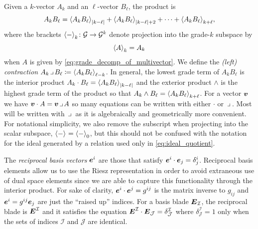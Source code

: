 \documentclass{article}
\begin{document}
Given a $k$-vector $A_k$ and an $\ell$-vector $B_\ell$, the product is
\begin{equation}
\label{eq:general_clifford_multiplication}
A_k B_\ell = \proj{|k-\ell|}{A_k B_\ell} + \proj{|k-\ell|+2}{A_k B_\ell} + \cdots + \proj{k+\ell}{A_k B_\ell},
\end{equation}
where the brackets $\proj{k}{-} \colon \G \to \G^k$ denote projection into the grade-$k$ subspace by
\begin{equation}
\proj{k}{A}=A_k
\end{equation}
when $A$ is given by \cref{eq:grade_decomp_of_multivector}. We define the \emph{(left) contraction} $A_k \contract B_\ell \coloneqq \proj{\ell-k}{A_k B_\ell}$. In general, the lowest grade term of $A_kB_\ell$ is the interior product $A_k \cdot B_\ell = \proj{|k-\ell|}{A_kB_\ell}$ and the exterior product $\wedge$ is the highest grade term of the product so that $A_k \wedge B_\ell = \proj{k+\ell}{A_k B_\ell}$. For a vector $\blade{v}$ we have $\blade{v}\cdot A = \blade{v}\contract A$ so many equations can be written with either $\cdot$ or $\contract$. Most will be written with $\contract$ as it is algebraically and geometrically more convenient. For notational simplicity, we also remove the subscript when projecting into the scalar subspace, $\proj{}{-}=\proj{0}{-}$, but this should not be confused with the notation for the ideal generated by a relation used only in \cref{eq:ideal_quotient}.

The \emph{reciprocal basis vectors $\blade{e}^i$} are those that satisfy $\blade{e}^i \cdot \blade{e}_j = \delta^i_j$. Reciprocal basis elements allow us to use the Riesz representation in order to avoid extraneous use of dual space elements since we are able to capture this functionality through the interior product. For sake of clarity, $\blade{e}^i \cdot \blade{e}^j = g^{ij}$ is the matrix inverse to $g_{ij}$ and $\blade{e}^i = g^{ij} \blade{e}_j$ are just the ``raised up'' indices. For a basis blade $\blade{E}_\mathcal{I}$, the reciprocal blade is $\blade{E}^\mathcal{I}$ and it satisfies the equation $\blade{E}^\mathcal{I} \cdot \blade{E}_\mathcal{J}= \delta^\mathcal{I}_\mathcal{J}$ where $\delta^\mathcal{I}_\mathcal{J}=1$ only when the sets of indices $\mathcal{I}$ and $\mathcal{J}$ are identical.
\end{document}

